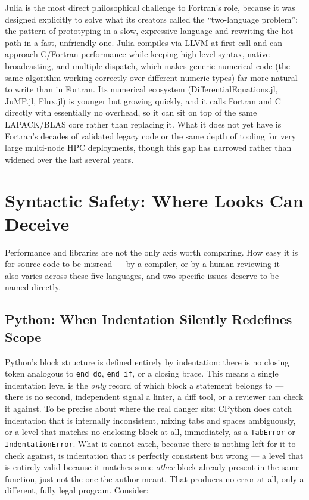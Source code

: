 Julia is the most direct philosophical challenge to Fortran's role, because it was designed explicitly to solve what its creators called the ``two-language problem'': the pattern of prototyping in a slow, expressive language and rewriting the hot path in a fast, unfriendly one. Julia compiles via LLVM at first call and can approach C/Fortran performance while keeping high-level syntax, native broadcasting, and multiple dispatch, which makes generic numerical code (the same algorithm working correctly over different numeric types) far more natural to write than in Fortran. Its numerical ecosystem (DifferentialEquations.jl, JuMP.jl, Flux.jl) is younger but growing quickly, and it calls Fortran and C directly with essentially no overhead, so it can sit on top of the same LAPACK/BLAS core rather than replacing it. What it does not yet have is Fortran's decades of validated legacy code or the same depth of tooling for very large multi-node HPC deployments, though this gap has narrowed rather than widened over the last several years.

\section{Syntactic Safety: Where Looks Can Deceive}

Performance and libraries are not the only axis worth comparing. How easy it is for source code to be misread --- by a compiler, or by a human reviewing it --- also varies across these five languages, and two specific issues deserve to be named directly.

\subsection{Python: When Indentation Silently Redefines Scope}

Python's block structure is defined entirely by indentation: there is no closing token analogous to \texttt{end do}, \texttt{end if}, or a closing brace. This means a single indentation level is the \emph{only} record of which block a statement belongs to --- there is no second, independent signal a linter, a diff tool, or a reviewer can check it against. To be precise about where the real danger sits: CPython does catch indentation that is internally inconsistent, mixing tabs and spaces ambiguously, or a level that matches no enclosing block at all, immediately, as a \texttt{TabError} or \texttt{IndentationError}. What it cannot catch, because there is nothing left for it to check against, is indentation that is perfectly consistent but wrong --- a level that is entirely valid because it matches some \emph{other} block already present in the same function, just not the one the author meant. That produces no error at all, only a different, fully legal program. Consider:

